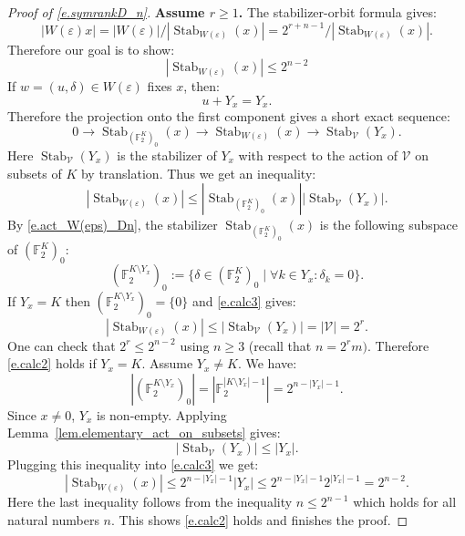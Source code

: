 \documentclass[12pt]{amsart}
\numberwithin{equation}{section}
\theoremstyle{definition}
\newcommand{\cV}{\mathcal{V}}
\newcommand{\bF}{\mathbb{F}}
\newcommand{\Stab}{\operatorname{Stab}}
\newcommand{\eps}{\varepsilon}
\begin{document}
\begin{proof}[Proof of \eqref{e.symrankD_n}]
  \smallskip
  \textbf{Assume $r\geq 1$.} The stabilizer-orbit formula gives:
        $$|W(\eps)x| = |W(\eps)|/|\Stab_{W(\eps)}(x)| = 2^{r+n -1}/|\Stab_{W(\eps)}(x)|.$$
    Therefore our goal is to show:
        \begin{equation}\label{e.calc2}
            |\Stab_{W(\eps)}(x)| \leq 2^{n -2}
        \end{equation}
    If $w=(u,\delta)\in W(\eps)$  fixes $x$, then:
    $$u+ Y_x = Y_x.$$
    Therefore the projection onto the first component gives a short exact sequence:
    $$0\to \Stab_{(\bF_2^K)_0}(x) \to \Stab_{W(\eps)}(x) \to \Stab_{\cV}(Y_x).$$
    Here $\Stab_{\cV}(Y_x)$ is the stabilizer of $Y_x$ with respect to the action of $\cV$ on subsets of $K$ by translation. Thus we get an inequality:
    \begin{equation}\label{e.calc3}
        |\Stab_{W(\eps)}(x) | \leq |\Stab_{(\bF_2^K)_0}(x)| |\Stab_{\cV}(Y_x)|.
    \end{equation}
    By \eqref{e.act_W(eps)_Dn}, the stabilizer $\Stab_{(\bF_2^{K})_0}(x)$ is the following subspace of $(\bF_2^{K})_0$:  
    \begin{equation}\label{e.Dn_def_of_F^m_0}
    (\bF_2^{K\setminus Y_x})_0  := \{ \delta\in (\bF_2^{K})_0  \mid \forall k\in Y_x: \delta_k = 0\}.
    \end{equation}
    If $Y_x = K$ then $(\bF_2^{K\setminus Y_x})_0 = \{0\}$ and \eqref{e.calc3} gives:
    $$|\Stab_{W(\eps)}(x) | \leq  |\Stab_{\cV}(Y_x)| = |\cV| = 2^r.$$
    One can check that $2^r \leq  2^{n-2}$ using $n\geq 3$ (recall that $n = 2^r m)$.
    Therefore \eqref{e.calc2} holds if $Y_x = K$.
    Assume $Y_x \neq K$. We have:
    $$| (\bF_2^{K\setminus Y_x})_0| = |\bF_2^{|K\setminus Y_x| -1}| = 2^{n- |Y_x|-1}.$$
    Since $x\neq 0$, $Y_x$ is non-empty. Applying Lemma~\ref{lem.elementary_act_on_subsets} gives:
    $$|\Stab_{\cV}(Y_x)|\leq |Y_x|.$$
    Plugging this inequality into \eqref{e.calc3} we get:
    $$|\Stab_{W(\eps)}(x) | \leq 2^{n- |Y_x|-1} |Y_x| \leq 2^{n- |Y_x|-1}  2^{|Y_x|-1} = 2^{n -2}.$$
    Here the last inequality follows from the inequality $n \leq 2^{n-1}$ which holds for all natural numbers $n$. This shows \eqref{e.calc2} holds and finishes the proof.
\end{proof}
\end{document}
